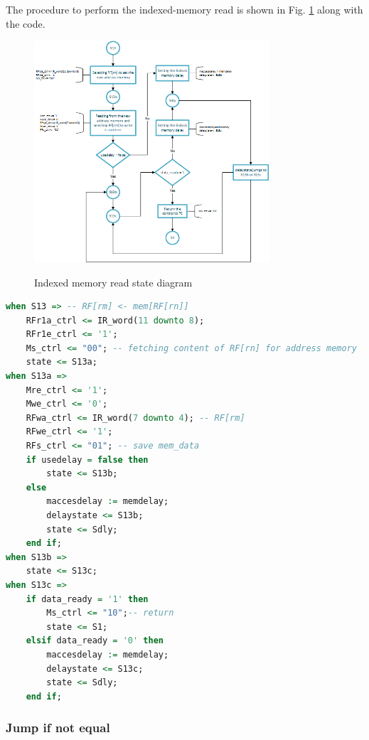 \documentclass[]{article}
\begin{document}
The procedure to perform the indexed-memory read is shown in Fig. \ref{fig:2} along with the code.
\begin{figure}[H]
	\caption{Indexed memory read state diagram}
	\centering
	\includegraphics[width=0.78\textwidth]{mov5}
	\label{fig:2}
\end{figure}
\begin{lstlisting}[language=vhdl, caption={Indexed memory read state vhdl}, label={}]
when S13 =>	-- RF[rm] <- mem[RF[rn]]  		 			
	RFr1a_ctrl <= IR_word(11 downto 8);	
	RFr1e_ctrl <= '1';  
	Ms_ctrl <= "00"; -- fetching content of RF[rn] for address memory			
	state <= S13a;
when S13a =>	
	Mre_ctrl <= '1';			
	Mwe_ctrl <= '0';
	RFwa_ctrl <= IR_word(7 downto 4); -- RF[rm]
	RFwe_ctrl <= '1';
	RFs_ctrl <= "01"; -- save mem_data
	if usedelay = false then 
		state <= S13b;
	else 
		maccesdelay := memdelay;
		delaystate <= S13b;
		state <= Sdly;
	end if;										
when S13b => 	
	state <= S13c;
when S13c => 	
	if data_ready = '1' then
		Ms_ctrl <= "10";-- return				
		state <= S1;
	elsif data_ready = '0' then
		maccesdelay := memdelay;
		delaystate <= S13c;
		state <= Sdly;
	end if;
\end{lstlisting}

\subsubsection{Jump if not equal}
\end{document}
